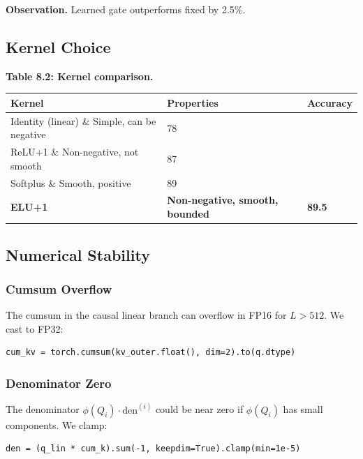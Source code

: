 \textbf{Observation.} Learned gate outperforms fixed by 2.5\%.

\subsection{Kernel Choice}

\textbf{Table 8.2: Kernel comparison.}

\begin{table}[H]
\centering
\small
\begin{tabular}{lll}
\toprule
\textbf{Kernel} & \textbf{Properties} & \textbf{Accuracy} \\
\midrule
Identity (linear) \& Simple, can be negative & 78 \\
ReLU+1 \& Non-negative, not smooth & 87 \\
Softplus \& Smooth, positive & 89 \\
\textbf{ELU+1} & \textbf{Non-negative, smooth, bounded} & \textbf{89.5} \\
\bottomrule
\end{tabular}
\end{table}

\subsection{Numerical Stability}

\subsubsection{Cumsum Overflow}

The cumsum in the causal linear branch can overflow in FP16 for $L > 512$. 
We cast to FP32:

\begin{lstlisting}
cum_kv = torch.cumsum(kv_outer.float(), dim=2).to(q.dtype)
\end{lstlisting}

\subsubsection{Denominator Zero}

The denominator $\phi(Q_i) \cdot \text{den}^{(i)}$ could be near zero if 
$\phi(Q_i)$ has small components. We clamp:

\begin{lstlisting}
den = (q_lin * cum_k).sum(-1, keepdim=True).clamp(min=1e-5)
\end{lstlisting}

